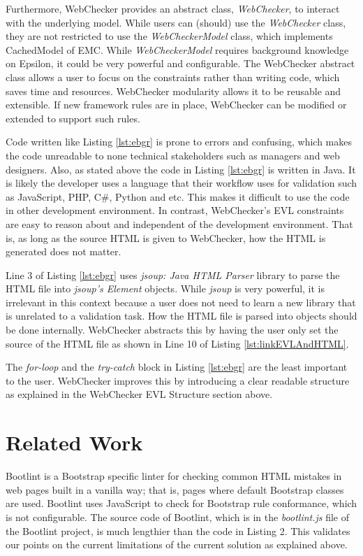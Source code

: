 \documentclass[conference]{IEEETran}
\begin{document}
Furthermore, WebChecker provides an abstract class, \textit{WebChecker},  to interact with the underlying model. While users can (should) use the \textit{WebChecker} class, they are not restricted to use the \textit{WebCheckerModel} class, which implements CachedModel of EMC. While \textit{WebCheckerModel} requires background knowledge on Epsilon, it could be very powerful and configurable. The WebChecker abstract class allows a user to focus on the constraints rather than writing code, which saves time and resources. WebChecker modularity allows it to be reusable and extensible. If new framework rules are in place, WebChecker can be modified or extended to support such rules. 

Code written like Listing \ref{lst:ebgr} is prone to errors and confusing, which makes the code unreadable to none technical stakeholders such as managers and web designers. Also, as stated above the code in Listing  \ref{lst:ebgr}  is written in Java. It is likely the developer uses a language that their workflow uses for validation such as JavaScript, PHP, C\#, Python and etc. This makes it difficult to use the code in other development environment. In contrast, WebChecker's EVL constraints are easy to reason about and independent of the development environment. That is, as long as the source HTML is given to WebChecker, how the HTML is generated does not matter. 

Line 3 of Listing \ref{lst:ebgr} uses \textit{jsoup: Java HTML Parser}\cite{jsoup} library to parse the HTML file into \textit{jsoup's Element} objects. While \textit{jsoup} is very powerful, it is irrelevant in this context because a user does not need to learn a new library that is unrelated to a validation task. How the HTML file is parsed into objects should be done internally. WebChecker abstracts this by having the user only set the source of the HTML file as shown in Line 10 of Listing \ref{lst:linkEVLAndHTML}.           


The \textit{for-loop} and the \textit{try-catch} block in Listing \ref{lst:ebgr} are the least important to the user. WebChecker improves this by introducing a clear readable structure as explained in the WebChecker EVL Structure section above.  


\section{Related Work}
Bootlint \cite{bootlint} is a Bootstrap specific linter for checking common HTML mistakes in web pages built in a vanilla way; that is, pages where default Bootstrap classes are used. Bootlint uses JavaScript to check for Bootstrap rule conformance, which is not configurable. The source code of Bootlint, which is in the \textit{bootlint.js} file of the Bootlint project, is much lengthier than the code in Listing 2. This validates our points on the current limitations of the current solution as explained above. 
\end{document}
